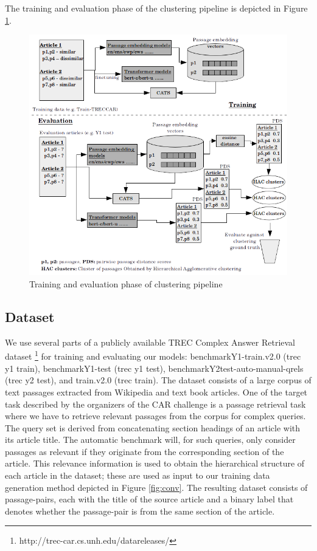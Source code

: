 The training and evaluation phase of the clustering pipeline is depicted in Figure \ref{fig:pipe}.
\begin{figure}[h]
  \centering
  \includegraphics[width=\linewidth]{graphics/pipeline2.png}
  \caption{Training and evaluation phase of clustering pipeline}
  \label{fig:pipe}
\end{figure}

\subsection{Dataset} 
We use several parts of a publicly available TREC Complex Answer Retrieval dataset \cite{dietz2017trec}\footnote{http://trec-car.cs.unh.edu/datareleases/} for training and evaluating our models: benchmarkY1-train.v2.0 (trec y1 train), benchmarkY1-test (trec y1 test), benchmarkY2test-auto-manual-qrels (trec y2 test), and train.v2.0 (trec train). The dataset consists of a large corpus of text passages extracted from Wikipedia and text book articles. One of the target task described by the organizers of the CAR challenge  is a passage retrieval task where we have to retrieve relevant passages from the corpus for complex queries. The query set is derived from concatenating section headings of an article with its article title. The automatic benchmark will, for such queries, only consider passages as relevant if they originate from the corresponding section of the article. This relevance information is used to obtain the hierarchical structure of each article in the dataset; these are used as input to our training data generation method depicted in Figure \ref{fig:conv}. The resulting dataset consists of passage-pairs, each with the title of the source article and a binary label that denotes whether the passage-pair is from the same section of the article.


